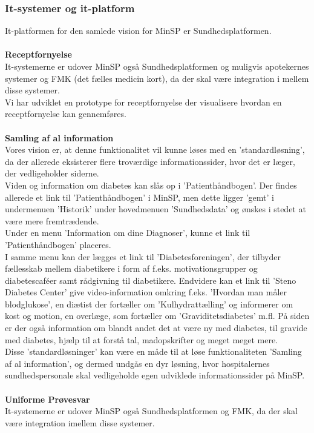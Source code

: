 \subsubsection{It-systemer og it-platform}
It-platformen for den samlede vision for MinSP er Sundhedsplatformen.
\\\\
\textbf{Receptfornyelse} \\
It-systemerne er udover MinSP også Sundhedsplatformen og muligvis apotekernes systemer og FMK (det fælles medicin kort), da der skal være integration i mellem disse systemer.\\
Vi har udviklet en prototype for receptfornyelse der visualisere hvordan en receptfornyelse kan gennemføres.
\\\\
\textbf{Samling af al information} \\
%
%
Vores vision er, at denne funktionalitet vil kunne løses med en 'standardløsning', da der allerede eksisterer flere troværdige informationssider, hvor det er læger, der vedligeholder siderne. \\
Viden og information om diabetes kan slås op i 'Patienthåndbogen'. Der findes allerede et link til 'Patienthåndbogen' i MinSP, men dette ligger 'gemt' i undermenuen 'Historik' under hovedmenuen 'Sundhedsdata' og ønskes i stedet at være mere fremtrædende. 
\\ 
Under en menu 'Information om dine Diagnoser', kunne et link til 'Patienthåndbogen' placeres. \\
I samme menu kan der lægges et link til 'Diabetesforeningen', der tilbyder fællesskab mellem diabetikere i form af f.eks. motivationsgrupper og diabetescaféer samt rådgivning til diabetikere.
Endvidere kan et link til 'Steno Diabetes Center' give video-information omkring f.eks. 'Hvordan man måler blodglukose', en diætist der fortæller om 'Kulhydrattælling' og informerer om kost og motion, en overlæge, som fortæller om 'Graviditetsdiabetes' m.fl. 
På siden er der også information om blandt andet det at være ny med diabetes, til gravide med diabetes, hjælp til at forstå tal, madopskrifter og meget meget mere. \\
Disse 'standardløsninger' kan være en måde til at løse funktionaliteten 'Samling af al information', og dermed undgås en dyr løsning, hvor hospitalernes sundhedspersonale skal vedligeholde egen udviklede informationssider på MinSP.
\\\\
\textbf{Uniforme Prøvesvar} \\
It-systemerne er udover MinSP også Sundhedsplatformen og FMK, da der skal være integration imellem disse systemer.
